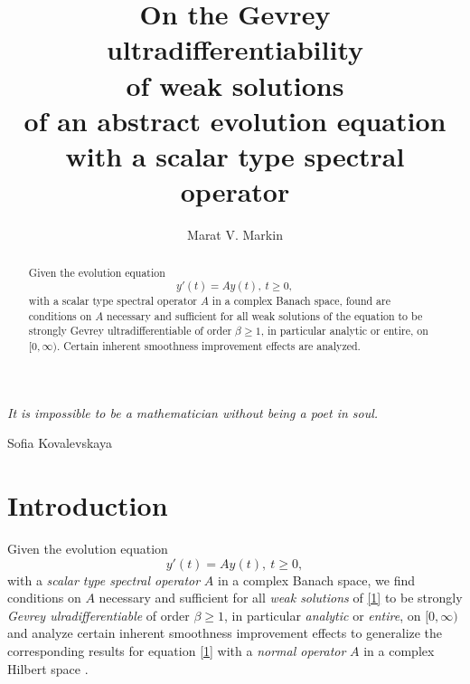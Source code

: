 \documentclass{amsart}
\theoremstyle{plain}
\theoremstyle{definition}
\begin{document}
\title[On the Gevrey ultradifferentiability of weak solutions]
{On the Gevrey ultradifferentiability\\ 
of weak solutions\\
of an abstract evolution equation\\
with a scalar type spectral operator}
\author[Marat V. Markin]{Marat V. Markin}
\address{
Department of Mathematics\newline
California State University, Fresno N. Backer Avenue, M/S PB 108\newline
Fresno, CA 93740-8001
}
\begin{abstract}
Given the evolution equation
\begin{equation*}
y'(t)=Ay(t),\ t\ge 0,
\end{equation*}
with a scalar type spectral operator $A$ in a complex Banach space, found are conditions on $A$ necessary and sufficient for all weak solutions of the equation to be strongly Gevrey ultradifferentiable of order $\beta\ge 1$, in particular analytic or entire, on $[0,\infty)$. Certain inherent smoothness improvement effects are analyzed.
\end{abstract}
\maketitle
\epigraph{\textit{It is impossible to be a mathematician without being a poet in soul.}}{Sofia Kovalevskaya}
\section[Introduction]{Introduction}

Given the evolution equation
\begin{equation}\label{1}
y'(t)=Ay(t),\ t\ge 0, 
\end{equation}
with a {\it scalar type spectral operator} $A$ in a complex Banach space, we find conditions on $A$ necessary and sufficient for all {\it weak solutions}
of \eqref{1} to be strongly \textit{Gevrey ulradifferentiable} of order $\beta\ge 1$, in particular \textit{analytic} or \textit{entire}, on $[0,\infty)$ and analyze certain inherent smoothness improvement effects to generalize the corresponding results for equation \eqref{1} with a \textit{normal operator} $A$ in a complex Hilbert space \cite{Markin2001(1)}.
\end{document}

